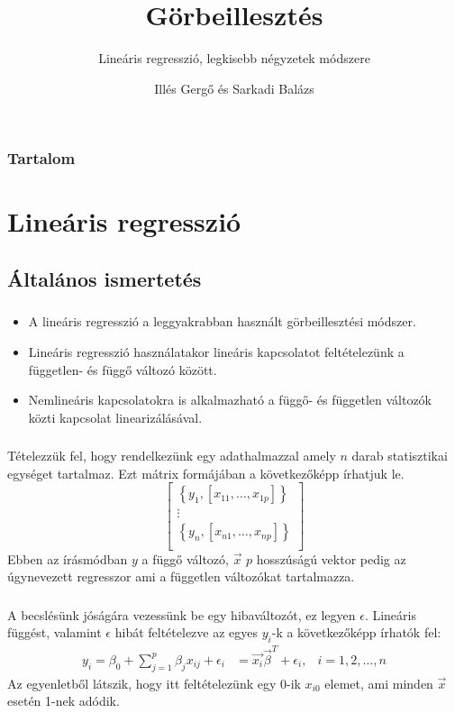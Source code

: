 \documentclass{beamer}
\title{Görbeillesztés}
\subtitle{Lineáris regresszió, legkisebb négyzetek módszere}
\author{Illés Gergő és Sarkadi Balázs}
\institute{PTE TTK Fizikai Intézet}
\begin{document}
\begin{frame}
\titlepage
\end{frame}
\begin{frame}
\frametitle{Tartalom}
\tableofcontents
\end{frame}
\section{Lineáris regresszió}
\subsection{Általános ismertetés}
\begin{frame}
\frametitle{\subsecname}
\begin{itemize}
\item A lineáris regresszió a leggyakrabban használt görbeillesztési módszer.
\item Lineáris regresszió használatakor lineáris kapcsolatot feltételezünk a független\hyp{} és függő változó között.
\item Nemlineáris kapcsolatokra is alkalmazható a függő\hyp{} és független változók közti kapcsolat linearizálásával.
\end{itemize}
\end{frame}
\begin{frame}
\frametitle{\subsecname}
Tételezzük fel, hogy rendelkezünk egy adathalmazzal amely $n$ darab statisztikai egységet tartalmaz. Ezt mátrix formájában a következőképp írhatjuk le.
\begin{equation*}
\left[
\begin{matrix}
\left\lbrace y_1,[x_{11},\dots,x_{1p}]\right\rbrace\\
\vdots\\
\left\lbrace y_n,[x_{n1},\dots,x_{np}]\right\rbrace\\
\end{matrix}
\right]
\end{equation*}
Ebben az írásmódban $y$ a függő változó, $\vec{x}$ $p$ hosszúságú vektor pedig az úgynevezett regresszor ami a független változókat tartalmazza.
\end{frame}
\begin{frame}
\frametitle{\subsecname}
A becslésünk jóságára vezessünk be egy hibaváltozót, ez legyen $\epsilon$. Lineáris függést, valamint $\epsilon$ hibát feltételezve az egyes $y_i$-k a következőképp írhatók fel:
\begin{align*}
y_i=\beta_0+\sum_{j=1}^{p}\beta_jx_{ij}+\epsilon_i&=\vec{x_i}\vec{\beta}^T+\epsilon_i, & i=1,2,\dots,n
\end{align*}
Az egyenletből látszik, hogy itt feltételezünk egy 0-ik $x_{i0}$ elemet, ami minden $\vec{x}$ esetén 1-nek adódik.
\end{frame}
\end{document}
